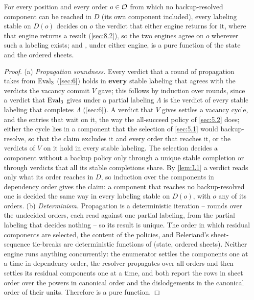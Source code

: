 \documentclass[12pt,a4paper]{article}
\begin{document}
\begin{theorem}\label{thm:T3}
For every position and every order $o \in \mathcal{O}$ from which no backup-resolved component can be reached in $D$ (its own component included), every labeling stable on $D(o)$ decides on $o$ the verdict that either engine returns for it, where that engine returns a result (\cref{sec:8.2}), so the two engines agree on $o$ wherever such a labeling exists; and , under either engine, is a pure function of the state and the ordered sheets.
\end{theorem}
\begin{proof}
(a) \emph{Propagation soundness.}
Every verdict that a round of propagation takes from $\operatorname{Eval}_3$ (\cref{sec:6}) holds in \textbf{every} stable labeling that agrees with the verdicts the vacancy commit $V$ gave; this follows by induction over rounds, since a verdict that $\operatorname{Eval}_3$ gives under a partial labeling $\Lambda$ is the verdict of every stable labeling that completes $\Lambda$ (\cref{sec:6}).
A verdict that $V$ gives settles a vacancy cycle, and the entries that wait on it, the way the all-succeed policy of \cref{sec:5.2} does; either the cycle lies in a component that the selection of \cref{sec:5.1} would backup-resolve, so that the claim excludes it and every order that reaches it, or the verdicts of $V$ on it hold in every stable labeling.
The selection decides a component without a backup policy only through a unique stable completion or through verdicts that all its stable completions share.
By \cref{lem:L1} a verdict reads only what its order reaches in $D$, so induction over the components in dependency order gives the claim: a component that reaches no backup-resolved one is decided the same way in every labeling stable on $D(o)$, with $o$ any of its orders.
(b) \emph{Determinism.}
Propagation is a deterministic iteration -- rounds over the undecided orders, each read against one partial labeling, from the partial labeling that decides nothing -- so its result is unique.
The order in which residual components are selected, the content of the policies, and Beleriand's sheet-sequence tie-breaks are deterministic functions of (state, ordered sheets).
Neither engine runs anything concurrently: the enumerator settles the components one at a time in dependency order, the resolver propagates over all orders and then settles its residual components one at a time, and both report the rows in sheet order over the powers in canonical order and the dislodgements in the canonical order of their units.
Therefore  is a pure function.
\end{proof}
\end{document}
